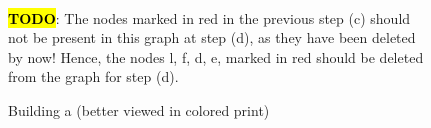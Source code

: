 \begin{figure}[ht]
{{}}
\\
\text \large \textcolor{red}{\textbf{\hl{TODO}}}: The nodes marked in red in the previous step (c) should
not be present in this graph at step (d), as they have been deleted by now! Hence, the nodes l, f, d, e, marked in red should be deleted from the graph for step (d).
\caption{Building a \PF (better viewed in colored print)}
\label{fig:building}
\end{figure}

